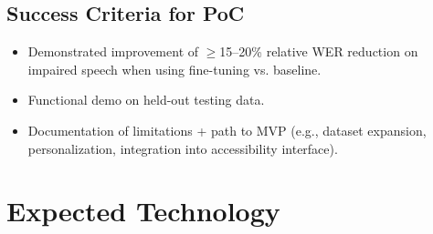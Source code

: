\documentclass{article}
\begin{document}
\subsection{Success Criteria for PoC}

\begin{itemize}
    \item Demonstrated improvement of $\geq$15--20\% relative WER reduction on impaired speech when using fine-tuning vs. baseline.
    \item Functional demo on held-out testing data.
    \item Documentation of limitations + path to MVP (e.g., dataset expansion, personalization, integration into accessibility interface).
\end{itemize}

\section{Expected Technology}
\begin{comment}
\wss{What programming language or languages do you expect to use?  What external
libraries?  What frameworks?  What technologies.  Are there major components of
the implementation that you expect you will implement, despite the existence of
libraries that provide the required functionality.  For projects with machine
learning, will you use pre-trained models, or be training your own model?  }

\wss{The implementation decisions can, and likely will, change over the course
of the project.  The initial documentation should be written in an abstract way;
it should be agnostic of the implementation choices, unless the implementation
choices are project constraints.  However, recording our initial thoughts on
implementation helps understand the challenge level and feasibility of a
project.  It may also help with early identification of areas where project
members will need to augment their training.}

Topics to discuss include the following:

\begin{itemize}
\item Specific programming language
\item Specific libraries
\item Pre-trained models
\item Specific linter tool (if appropriate)
\item Specific unit testing framework
\item Investigation of code coverage measuring tools
\item Specific plans for Continuous Integration (CI), or an explanation that CI
  is not being done
\item Specific performance measuring tools (like Valgrind), if
  appropriate
\item Tools you will likely be using?
\end{itemize}

\wss{git, GitHub and GitHub projects should be part of your technology.}
\end{comment}
\end{document}
